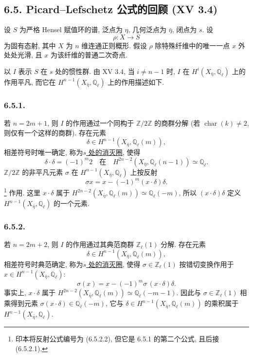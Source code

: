 \subsection*{6.5. Picard--Lefschetz 公式的回顾 (XV 3.4)}

设 $S$ 为严格 Hensel 赋值环的谱, 泛点为 $\eta$, 几何泛点为 $\bar\eta$, 闭点为 $s$. 设
\[
\rho:X\longrightarrow S
\]
为固有态射, 其中 $X$ 为 $n$ 维连通正则概形. 假设 $\rho$ 除特殊纤维中的唯一一点 $x$ 外处处光滑, 且 $x$ 为该纤维的普通二次奇点.

以 $I$ 表示 $S$ 在 $s$ 处的惯性群. 由 XV 3.4, 当 $i\ne n-1$ 时, $I$ 在 $H^i(X_{\bar\eta},\mathbb Q_\ell)$ 上的作用平凡, 而它在 $H^{n-1}(X_{\bar\eta},\mathbb Q_\ell)$ 上的作用描述如下.

\subsubsection*{6.5.1.}
若 $n=2m+1$, 则 $I$ 的作用通过一个同构于 $\mathbb Z/2\mathbb Z$ 的商群分解 (若 $\operatorname{char}(k)\ne2$, 则仅有一个这样的商群). 存在元素
\[
\delta\in H^{n-1}(X_{\bar\eta},\mathbb Q_\ell(m)),
\]
相差符号时唯一确定, 称为\underline{$s$ 处的消灭圈}, 使得
\begin{equation}\tag{6.5.1.1}
\delta\cdot\delta=(-1)^m2
\quad\text{在}\quad
H^{2n-2}(X_{\bar\eta},\mathbb Q_\ell(n-1))\simeq\mathbb Q_\ell.
\end{equation}
$\mathbb Z/2\mathbb Z$ 的非平凡元素 $\sigma$ 在 $H^{n-1}(X_{\bar\eta},\mathbb Q_\ell)$ 上按反射
\begin{equation}\tag{6.5.1.2}
\sigma x=x-(-1)^m(x\cdot\delta)\delta.
\end{equation}
\footnote{印本将反射公式编号为 (6.5.2.2), 但它是 6.5.1 的第二个公式, 且后接 (6.5.2.1).}
作用. 这里 $x\cdot\delta$ 属于 $H^{2n-2}(X_{\bar\eta},\mathbb Q_\ell(m))\simeq\mathbb Q_\ell(-m)$, 所以 $(x\cdot\delta)\delta$ 定义 $H^{n-1}(X_{\bar\eta},\mathbb Q_\ell)$ 的一个元素.

\subsubsection*{6.5.2.}
若 $n=2m+2$, 则 $I$ 的作用通过其典范商群 $\mathbb Z_\ell(1)$ 分解. 存在元素
\[
\delta\in H^{n-1}(X_{\bar\eta},\mathbb Q_\ell(m)),
\]
相差符号时典范确定, 称为\underline{$s$ 处的消灭圈}, 使得 $\sigma\in\mathbb Z_\ell(1)$ 按错切变换作用于 $x\in H^{n-1}(X_{\bar\eta},\mathbb Q_\ell)$:
\begin{equation}\tag{6.5.2.1}
\sigma(x)=x-(-1)^m\sigma\,(x\cdot\delta)\delta.
\end{equation}
事实上, $x\cdot\delta$ 属于 $H^{2n-2}(X_{\bar\eta},\mathbb Q_\ell(m))\simeq\mathbb Q_\ell(-m-1)$. 因此与 $\sigma\in\mathbb Z_\ell(1)$ 相乘得到元素 $\sigma(x\cdot\delta)\in\mathbb Q_\ell(-m)$, 它与 $\delta\in H^{n-1}(X_{\bar\eta},\mathbb Q_\ell(m))$ 的乘积属于 $H^{n-1}(X_{\bar\eta},\mathbb Q_\ell)$.

